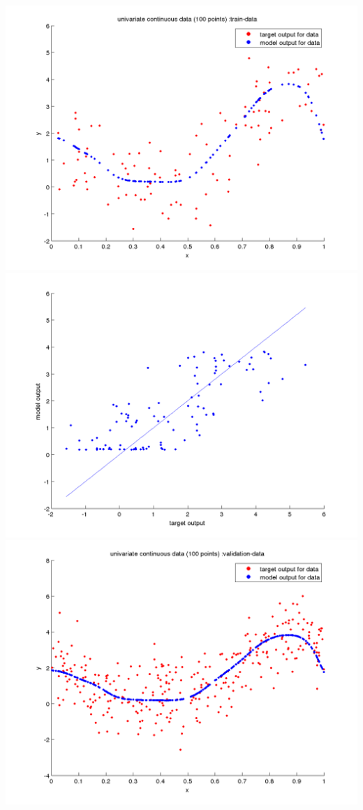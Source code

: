 \documentclass[fleqn]{article}
\begin{document}
\includegraphics[scale=0.4]{./pics/univariate100_morenoise/_6/_6_epoch_Inf_train-data_scatter3d}
\includegraphics[scale=0.4]{./pics/univariate100_morenoise/_6/_6_epoch_Inf_train-data_scatter2d}
\includegraphics[scale=0.4]{./pics/univariate100_morenoise/_6/_6_epoch_Inf_validation-data_scatter3d}
\end{document}
